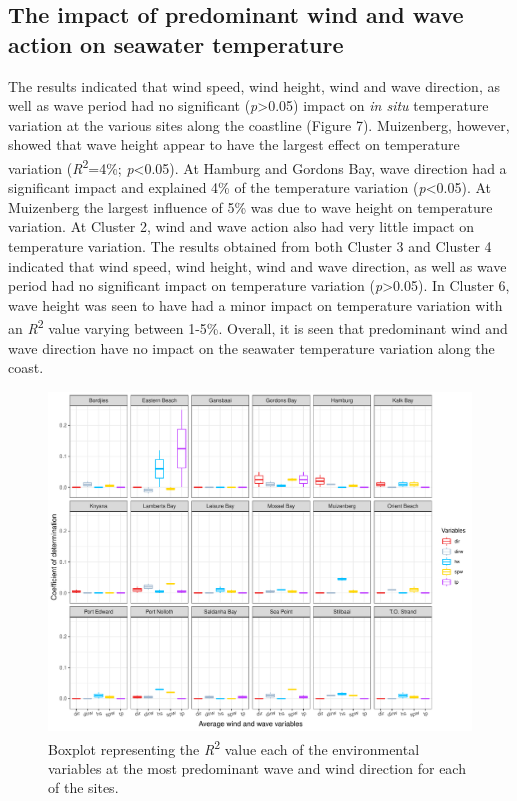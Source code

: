 \documentclass[10pt,a4paper,]{article}
\begin{document}
\hypertarget{the-impact-of-predominant-wind-and-wave-action-on-seawater-temperature}{%
\subsection{The impact of predominant wind and wave action on seawater
temperature}\label{the-impact-of-predominant-wind-and-wave-action-on-seawater-temperature}}

The results indicated that wind speed, wind height, wind and wave
direction, as well as wave period had no significant
(\emph{p}\textgreater{}0.05) impact on \emph{in situ} temperature
variation at the various sites along the coastline (Figure 7).
Muizenberg, however, showed that wave height appear to have the largest
effect on temperature variation (\emph{R}\textsuperscript{2}=4\%;
\emph{p}\textless{}0.05). At Hamburg and Gordons Bay, wave direction had
a significant impact and explained 4\% of the temperature variation
(\emph{p}\textless{}0.05). At Muizenberg the largest influence of 5\%
was due to wave height on temperature variation. At Cluster 2, wind and
wave action also had very little impact on temperature variation. The
results obtained from both Cluster 3 and Cluster 4 indicated that wind
speed, wind height, wind and wave direction, as well as wave period had
no significant impact on temperature variation
(\emph{p}\textgreater{}0.05). In Cluster 6, wave height was seen to have
had a minor impact on temperature variation with an
\emph{R}\textsuperscript{2} value varying between 1-5\%. Overall, it is
seen that predominant wind and wave direction have no impact on the
seawater temperature variation along the coast.

\begin{figure}
\centering
\includegraphics{../figures/predominant_ww.pdf}
\caption{Boxplot representing the \emph{R}\textsuperscript{2} value each
of the environmental variables at the most predominant wave and wind
direction for each of the sites.}
\end{figure}
\end{document}
